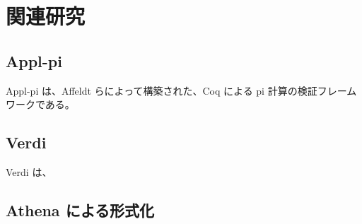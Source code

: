 \chapter{関連研究}

\section{Appl-pi}

Appl-pi は、Affeldt らによって構築された、Coq による pi 計算の検証フレームワークである。

\section{Verdi}

Verdi は、

\section{Athena による形式化}
